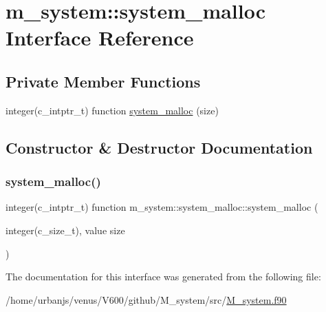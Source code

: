 \hypertarget{interfacem__system_1_1system__malloc}{}\section{m\+\_\+system\+:\+:system\+\_\+malloc Interface Reference}
\label{interfacem__system_1_1system__malloc}
\subsection*{Private Member Functions}
\begin{DoxyCompactItemize}
\item 
integer(c\+\_\+intptr\+\_\+t) function \mbox{\hyperlink{interfacem__system_1_1system__malloc_a0c05d3cf8085da10afdb49b3b824540f}{system\+\_\+malloc}} (size)
\end{DoxyCompactItemize}


\subsection{Constructor \& Destructor Documentation}
\mbox{\label{interfacem__system_1_1system__malloc_a0c05d3cf8085da10afdb49b3b824540f}} 
\subsubsection{\texorpdfstring{system\+\_\+malloc()}{system\_malloc()}}
{\footnotesize\ttfamily integer(c\+\_\+intptr\+\_\+t) function m\+\_\+system\+::system\+\_\+malloc\+::system\+\_\+malloc (\begin{DoxyParamCaption}\item[{integer(c\+\_\+size\+\_\+t), value}]{size }\end{DoxyParamCaption})\hspace{0.3cm}{\ttfamily [private]}}



The documentation for this interface was generated from the following file\+:\begin{DoxyCompactItemize}
\item 
/home/urbanjs/venus/\+V600/github/\+M\+\_\+system/src/\mbox{\hyperlink{M__system_8f90}{M\+\_\+system.\+f90}}\end{DoxyCompactItemize}
